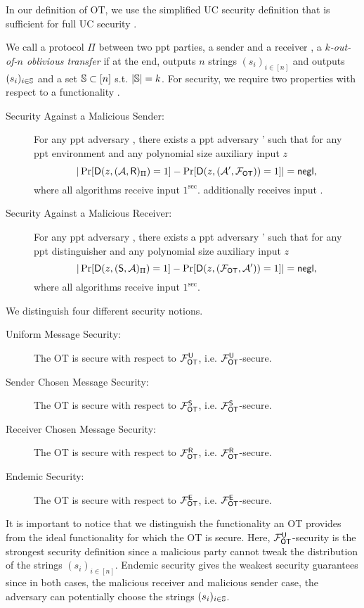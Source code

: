 In our definition of OT, we use the simplified UC security definition that is sufficient for full UC security \cite{C:CanCohLin15}. 
\begin{definition}\label{def:otSec}
We call a protocol $\Pi$ between two ppt parties, a sender \send and a receiver \rec, a \emph{$k$-out-of-$n$ oblivious transfer} if %
at the end, \send outputs $n$ strings $(s_i)_{i\in[n]}$ and \rec outputs $(s_i)_{i\in\mathsf{\mathbb S}}$ and a set $\mathsf{\mathbb S}\subset[n]$ s.t. $|\mathsf{\mathbb S}|=k$. For security, we require two properties with respect to a functionality \OOT.
\begin{description}
\item[Security Against a Malicious Sender:] For any ppt adversary \Adv, there exists a ppt adversary \Adv' such that for any ppt environment \D and any polynomial size auxiliary input $z$
$$
|\Pr[\mathsf D(z,(\mathcal{A},\mathsf{R})_{\Pi})=1] -\Pr[\mathsf D(z,(\mathcal{A}', \mathcal{F}_{\mathsf{OT}}))=1]|=\mathsf{negl},
$$
where all algorithms receive input $1^\sec$. \rec additionally receives input \set.
\item[Security Against a Malicious Receiver:] For any ppt adversary \Adv, there exists a ppt adversary \Adv' such that for any ppt distinguisher \D and any polynomial size auxiliary input $z$
$$
|\Pr[\mathsf D(z, (\mathsf{S}, \mathcal{A})_{\Pi})=1] -\Pr[\mathsf D(z, (\mathcal{F}_{\mathsf{OT}},\mathcal{A}'))=1]|=\mathsf{negl},
$$
where all algorithms receive input $1^\sec$.
\end{description}


We distinguish four different security notions.
\begin{description}
\item[Uniform Message Security:] The OT is secure with respect to $\mathcal{F}_{\mathsf{OT}}^\mathsf{U}$, i.e. $\mathcal{F}_{\mathsf{OT}}^\mathsf{U}$-secure.
\item[Sender Chosen Message Security:] The OT is secure with respect to $\mathcal{F}_{\mathsf{OT}}^{\mathsf{S}}$, i.e. $\mathcal{F}_{\mathsf{OT}}^{\mathsf{S}}$-secure.
\item[Receiver Chosen Message Security:] The OT is secure with respect to $\mathcal{F}_{\mathsf{OT}}^{\mathsf{R}}$, i.e. $\mathcal{F}_{\mathsf{OT}}^{\mathsf{R}}$-secure.
\item[Endemic Security:] The OT is secure with respect to $\mathcal{F}_{\mathsf{OT}}^{\mathsf{E}}$, i.e. $\mathcal{F}_{\mathsf{OT}}^{\mathsf{E}}$-secure.
\end{description}


\end{definition}

\begin{remark}
It is important to notice that we distinguish the functionality an OT provides from the ideal functionality for which the OT is secure. Here, 
$\mathcal{F}_{\mathsf{OT}}^\mathsf{U}$-security is the strongest security definition since a malicious party cannot tweak the distribution of the strings  $(s_i)_{i\in[n]}$. Endemic security gives the weakest security guarantees since in both cases, the malicious receiver and malicious sender case, the adversary can potentially choose the strings $(s_i)_{i\in\mathsf{\mathbb S}}$.
\end{remark}

